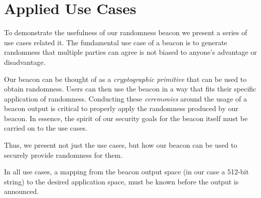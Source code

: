 \section{Applied Use Cases}
To demonstrate the usefulness of our randomness beacon we present a series of use cases related it.
The fundamental use case of a beacon is to generate randomness that multiple parties can agree is not biased to anyone's advantage or disadvantage.

Our beacon can be thought of as a \emph{cryptographic primitive} that can be used to obtain randomness.
Users can then use the beacon in a way that fits their specific application of randomness.
Conducting these \emph{ceremonies} around the usage of a beacon output is critical to properly apply the randomness produced by our beacon.
In essence, the spirit of our security goals for the beacon itself must be carried on to the use cases.

Thus, we present not just the use cases, but how our beacon can be used to securely provide randomness for them.

In all use cases, a mapping from the beacon output space (in our case a 512-bit string) to the desired application space, must be known before the output is announced.

